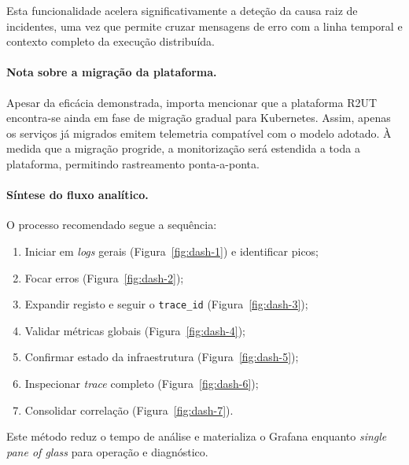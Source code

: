 Esta funcionalidade acelera significativamente a deteção da causa raiz de incidentes, 
uma vez que permite cruzar mensagens de erro com a linha temporal e contexto completo 
da execução distribuída.

\paragraph{Nota sobre a migração da plataforma.}
Apesar da eficácia demonstrada, importa mencionar que a plataforma R2UT encontra-se ainda 
em fase de migração gradual para Kubernetes. Assim, apenas os serviços já migrados 
emitem telemetria compatível com o modelo adotado. À medida que a migração progride, a 
monitorização será estendida a toda a plataforma, permitindo rastreamento ponta-a-ponta.

\paragraph{Síntese do fluxo analítico.}
O processo recomendado segue a sequência:

\begin{enumerate}
\item Iniciar em \textit{logs} gerais (Figura~\ref{fig:dash-1}) e identificar picos;
\item Focar erros (Figura~\ref{fig:dash-2});
\item Expandir registo e seguir o \texttt{trace\_id} (Figura~\ref{fig:dash-3});
\item Validar métricas globais (Figura~\ref{fig:dash-4});
\item Confirmar estado da infraestrutura (Figura~\ref{fig:dash-5});
\item Inspecionar \textit{trace} completo (Figura~\ref{fig:dash-6});
\item Consolidar correlação (Figura~\ref{fig:dash-7}).
\end{enumerate}

Este método reduz o tempo de análise e materializa o Grafana enquanto \textit{single pane of glass} 
para operação e diagnóstico.






